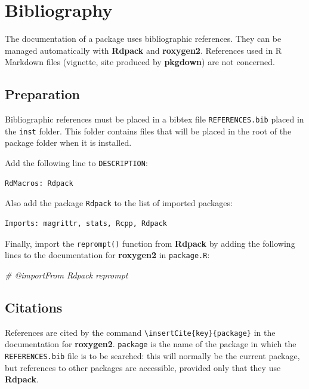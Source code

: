 \documentclass[
  12pt,
  american,
  a4paper,
  extrafontsizes,onecolumn,openright
  ]{memoir}
\newenvironment{Shaded}{\begin{snugshade}}{\end{snugshade}}
\newcommand{\CommentTok}[1]{\textcolor[rgb]{0.56,0.35,0.01}{\textit{#1}}}
\begin{document}
\section{Bibliography}\label{bibliography-1}

The documentation of a package uses bibliographic references.
They can be managed automatically with \textbf{Rdpack} and \textbf{roxygen2}.
References used in R Markdown files (vignette, site produced by \textbf{pkgdown}) are not concerned.

\subsection{Preparation}\label{preparation}

Bibliographic references must be placed in a bibtex file \texttt{REFERENCES.bib} placed in the \texttt{inst} folder.
This folder contains files that will be placed in the root of the package folder when it is installed.

Add the following line to \texttt{DESCRIPTION}:

\begin{verbatim}
RdMacros: Rdpack
\end{verbatim}

Also add the package \texttt{Rdpack} to the list of imported packages:

\begin{verbatim}
Imports: magrittr, stats, Rcpp, Rdpack
\end{verbatim}

Finally, import the \texttt{reprompt()} function from \textbf{Rdpack} by adding the following lines to the documentation for \textbf{roxygen2} in \texttt{package.R}:

\scriptsize

\begin{Shaded}
\begin{Highlighting}[]
\CommentTok{\#\textquotesingle{} @importFrom Rdpack reprompt}
\end{Highlighting}
\end{Shaded}

\normalsize

\subsection{Citations}\label{citations}

References are cited by the command \texttt{\textbackslash{}insertCite\{key\}\{package\}} in the documentation for \textbf{roxygen2}.
\texttt{package} is the name of the package in which the \texttt{REFERENCES.bib} file is to be searched: this will normally be the current package, but references to other packages are accessible, provided only that they use \textbf{Rdpack}.
\end{document}
